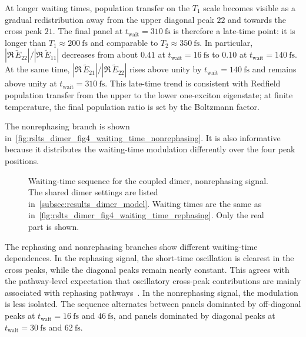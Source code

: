 At longer waiting times, population transfer on the \(T_{1}\) scale becomes
visible as a gradual redistribution away from the upper diagonal peak \(22\)
and towards the cross peak \(21\). The final panel at
\(t_{\mathrm{wait}}=\SI{310}{\femto\second}\) is therefore a late-time point:
it is longer than \(T_{1}\approx\SI{200}{\femto\second}\) and comparable to
\(T_{2}\approx\SI{350}{\femto\second}\). In particular,
\(|\Re\,\tilde{E}_{22}|/|\Re\,\tilde{E}_{11}|\) decreases from
about \(0.41\) at \(t_{\mathrm{wait}}=\SI{16}{\femto\second}\) to \(0.10\) at
\(t_{\mathrm{wait}}=\SI{140}{\femto\second}\). At the same time,
\(|\Re\,\tilde{E}_{21}|/|\Re\,\tilde{E}_{22}|\) rises above
unity by \(t_{\mathrm{wait}}=\SI{140}{\femto\second}\) and remains above unity
at \(t_{\mathrm{wait}}=\SI{310}{\femto\second}\). This late-time trend is
consistent with Redfield population transfer from the upper to the lower
one-exciton eigenstate; at finite temperature, the final population ratio is
set by the Boltzmann factor.

The nonrephasing branch is shown in~\autoref{fig:rslts_dimer_fig4_waiting_time_nonrephasing}. It is also informative because it distributes the waiting-time modulation differently over the four peak positions.

\begin{figure}[htbp]
  \centering
\caption{Waiting-time sequence for the coupled dimer, nonrephasing signal. The
shared dimer settings are listed in~\autoref{subsec:results_dimer_model}.
Waiting times are the same as
in~\autoref{fig:rslts_dimer_fig4_waiting_time_rephasing}. Only the real part
is shown.}
  \label{fig:rslts_dimer_fig4_waiting_time_nonrephasing}
\end{figure}

The rephasing and nonrephasing branches show different waiting-time dependences. In the rephasing signal, the short-time oscillation is clearest in the cross peaks, while the diagonal peaks remain nearly constant. This agrees with the pathway-level expectation that oscillatory cross-peak contributions are mainly associated with rephasing pathways~\cite{mancal2022nonlinearopticalspectroscopy}. In the nonrephasing signal, the modulation is less isolated. The sequence alternates between panels dominated by off-diagonal peaks at \(t_{\mathrm{wait}}=\SI{16}{\femto\second}\) and \(\SI{46}{\femto\second}\), and panels dominated by diagonal peaks at \(t_{\mathrm{wait}}=\SI{30}{\femto\second}\) and \(\SI{62}{\femto\second}\).

